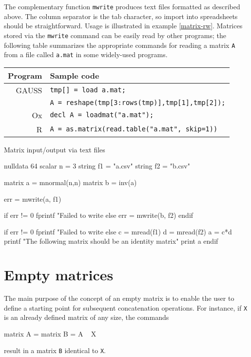 The complementary function \texttt{mwrite} produces text files
formatted as described above.  The column separator is the tab
character, so import into spreadsheets should be straightforward.
Usage is illustrated in example \ref{matrix-rw}.  Matrices stored via
the \texttt{mwrite} command can be easily read by other programs; the
following table summarizes the appropriate commands for reading a
matrix \texttt{A} from a file called \texttt{a.mat} in some
widely-used programs.

\begin{center}
  \begin{tabular}{rl}
    \textbf{Program} & \textbf{Sample code} \\
    \hline
    GAUSS & \verb|tmp[] = load a.mat;| \\
    & \verb|A = reshape(tmp[3:rows(tmp)],tmp[1],tmp[2]);| \\
    Ox    & \verb|decl A = loadmat("a.mat");| \\
    R     & \verb|A = as.matrix(read.table("a.mat", skip=1))| \\
  \hline
\end{tabular}
\end{center}


\begin{script}[htbp]
  \caption{Matrix input/output via text files}
  \label{matrix-rw}
  \begin{code}
nulldata 64
scalar n = 3
string f1 = "a.csv"
string f2 = "b.csv"

matrix a = mnormal(n,n)
matrix b = inv(a)

err = mwrite(a, f1)

if err != 0
  fprintf "Failed to write %
else
  err = mwrite(b, f2)
endif 

if err != 0
  fprintf "Failed to write %
else
  c = mread(f1)
  d = mread(f2)
  a = c*d
  printf "The following matrix should be an identity matrix\n"
  print a
endif
  \end{code}
\end{script}

\section{Empty matrices}
\label{sec:emptymatrix}

The main purpose of the concept of an empty matrix is to enable the
user to define a starting point for subsequent concatenation
operations.  For instance, if \texttt{X} is an already defined
matrix of any size, the commands
%
\begin{code}
  matrix A = {}
  matrix B = A ~ X
\end{code}
%
result in a matrix \texttt{B} identical to \texttt{X}.

